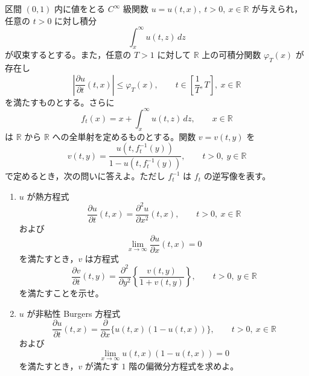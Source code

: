 \newcommand{\C}{\mathbb{C}}
\newcommand{\R}{\mathbb{R}}
\newcommand{\Z}{\mathbb{Z}}
\newcommand{\Tr}{\operatorname{Tr}}
\newcommand{\Impart}{\operatorname{Im}}
\newcommand{\AF}{\operatorname{AF}}
\newcommand{\AX}{\operatorname{AX}}
\newcommand{\GL}{\operatorname{GL}}


区間 \((0,1)\) 内に値をとる \(C^\infty\) 級関数
\(u=u(t,x),\ t>0,\ x\in\R\) が与えられ，任意の \(t>0\) に対し積分
\[
  \int_x^\infty u(t,z)\,dz
\]
が収束するとする。また，任意の \(T>1\) に対して \(\R\) 上の可積分関数 \(\varphi_T(x)\) が存在し
\[
  \left|\frac{\partial u}{\partial t}(t,x)\right|\le \varphi_T(x),
  \qquad
  t\in\left[\frac1T,T\right],\ x\in\R
\]
を満たすものとする。さらに
\[
  f_t(x)=x+\int_x^\infty u(t,z)\,dz,\qquad x\in\R
\]
は \(\R\) から \(\R\) への全単射を定めるものとする。関数 \(v=v(t,y)\) を
\[
  v(t,y)=\frac{u(t,f_t^{-1}(y))}{1-u(t,f_t^{-1}(y))},
  \qquad t>0,\ y\in\R
\]
で定めるとき，次の問いに答えよ。ただし \(f_t^{-1}\) は \(f_t\) の逆写像を表す。

\begin{enumerate}
  \item \(u\) が熱方程式
  \[
    \frac{\partial u}{\partial t}(t,x)=\frac{\partial^2u}{\partial x^2}(t,x),
    \qquad t>0,\ x\in\R
  \]
  および
  \[
    \lim_{x\to\infty}\frac{\partial u}{\partial x}(t,x)=0
  \]
  を満たすとき，\(v\) は方程式
  \[
    \frac{\partial v}{\partial t}(t,y)
      =\frac{\partial^2}{\partial y^2}\left\{\frac{v(t,y)}{1+v(t,y)}\right\},
    \qquad t>0,\ y\in\R
  \]
  を満たすことを示せ。
  \item \(u\) が非粘性 Burgers 方程式
  \[
    \frac{\partial u}{\partial t}(t,x)
      =\frac{\partial}{\partial x}\{u(t,x)(1-u(t,x))\},
    \qquad t>0,\ x\in\R
  \]
  および
  \[
    \lim_{x\to\infty}u(t,x)(1-u(t,x))=0
  \]
  を満たすとき，\(v\) が満たす \(1\) 階の偏微分方程式を求めよ。
\end{enumerate}

%